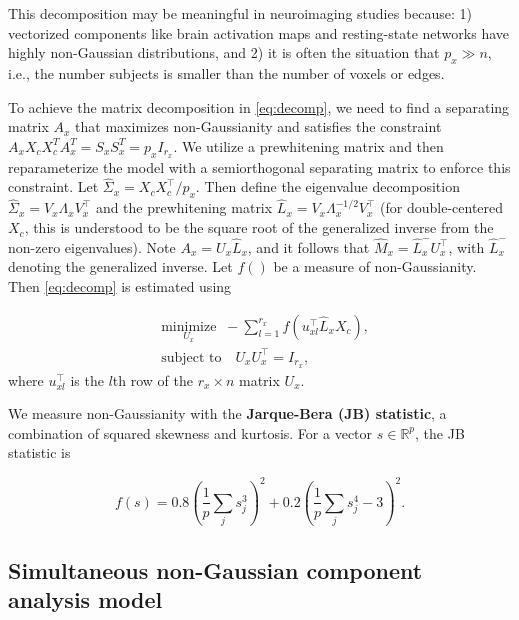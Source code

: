 This decomposition may be meaningful in neuroimaging studies because: 1) vectorized components like brain activation maps and resting-state networks have highly non-Gaussian distributions, and 2) it is often the situation that \(p_x \gg n\), i.e., the number subjects is smaller than the number of voxels or edges.

To achieve the matrix decomposition in \eqref{eq:decomp}, we need to find a separating matrix \(A_{x}\) that maximizes non-Gaussianity and satisfies the constraint \(A_{x}X_{c}X_{c}^{T}A_{x}^{T}=S_{x}S_{x}^{T}=p_{x}I_{r_{x}}\). We utilize a prewhitening matrix and then reparameterize the model with a semiorthogonal separating matrix to enforce this constraint. Let \(\widehat{\Sigma}_{x}=X_{c} X_{c}^{\top} / p_{x}\). Then define the eigenvalue decomposition \(\widehat{\Sigma}_{x}=V_{x} \Lambda_{x} V_{x}^{\top}\) and the prewhitening matrix \(\widehat{L}_{x}=V_{x} \Lambda_{x}^{-1 / 2} V_{x}^{\top}\) (for double-centered \(X_c\), this is understood to be the square root of the generalized inverse from the non-zero eigenvalues). Note \(A_{x}=U_{x} \widehat{L}_{x}\), and it follows that \(\widehat{M}_x = \widehat{L}_x^{-}U_x^\top\), with \(\widehat{L}_x^-\) denoting the generalized inverse. Let \(f()\) be a measure of non-Gaussianity. Then \eqref{eq:decomp} is estimated using

\begin{equation}
\begin{split}
& \underset{U_{x}}{\text{minimize}}\;\;-\sum_{l=1}^{r_{x}} f\left(u_{x l}^{\top} \widehat{L}_{x} X_{c}\right),\\ 
& \text{subject to}\quad   U_{x} U_{x}^{\top}=I_{r_{x}},
\end{split}
\label{eq:minU}
\end{equation}
where \(u_{x l}^{\top}\) is the \(l\)th row of the \(r_{x}\times n\) matrix \(U_{x}\).

We measure non-Gaussianity with the \textbf{Jarque-Bera (JB) statistic}, a combination of squared skewness and kurtosis. For a vector \(s \in \mathbb{R} ^{p}\), the JB statistic is

\begin{equation}
f(s)=0.8\left(\frac{1}{p} \sum_{j} s_{j}^{3}\right)^{2}+0.2\left(\frac{1}{p} \sum_{j} s_{j}^{4}-3\right)^{2}.
\label{eq:jbstatistics}
\end{equation}

\hypertarget{simultaneous-non-gaussian-component-analysis-model}{%
\subsection{Simultaneous non-Gaussian component analysis model}\label{simultaneous-non-gaussian-component-analysis-model}}

